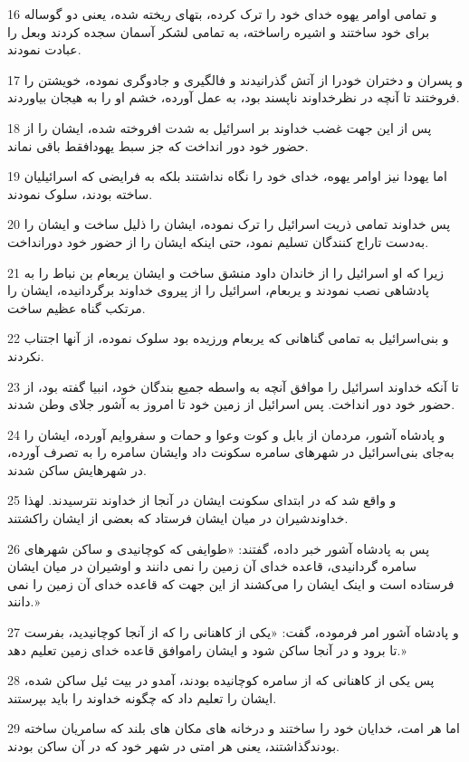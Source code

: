 \par 16 و تمامی اوامر یهوه خدای خود را ترک کرده، بتهای ریخته شده، یعنی دو گوساله برای خود ساختند و اشیره راساخته، به تمامی لشکر آسمان سجده کردند وبعل را عبادت نمودند.
\par 17 و پسران و دختران خودرا از آتش گذرانیدند و فالگیری و جادوگری نموده، خویشتن را فروختند تا آنچه در نظرخداوند ناپسند بود، به عمل آورده، خشم او را به هیجان بیاوردند.
\par 18 پس از این جهت غضب خداوند بر اسرائیل به شدت افروخته شده، ایشان را از حضور خود دور انداخت که جز سبط یهودافقط باقی نماند.
\par 19 اما یهودا نیز اوامر یهوه، خدای خود را نگاه نداشتند بلکه به فرایضی که اسرائیلیان ساخته بودند، سلوک نمودند.
\par 20 پس خداوند تمامی ذریت اسرائیل را ترک نموده، ایشان را ذلیل ساخت و ایشان را به‌دست تاراج کنندگان تسلیم نمود، حتی اینکه ایشان را از حضور خود دورانداخت.
\par 21 زیرا که او اسرائیل را از خاندان داود منشق ساخت و ایشان یربعام بن نباط را به پادشاهی نصب نمودند و یربعام، اسرائیل را از پیروی خداوند برگردانیده، ایشان را مرتکب گناه عظیم ساخت.
\par 22 و بنی‌اسرائیل به تمامی گناهانی که یربعام ورزیده بود سلوک نموده، از آنها اجتناب نکردند.
\par 23 تا آنکه خداوند اسرائیل را موافق آنچه به واسطه جمیع بندگان خود، انبیا گفته بود، از حضور خود دور انداخت. پس اسرائیل از زمین خود تا امروز به آشور جلای وطن شدند.
\par 24 و پادشاه آشور، مردمان از بابل و کوت وعوا و حمات و سفروایم آورده، ایشان را به‌جای بنی‌اسرائیل در شهرهای سامره سکونت داد وایشان سامره را به تصرف آورده، در شهرهایش ساکن شدند.
\par 25 و واقع شد که در ابتدای سکونت ایشان در آنجا از خداوند نترسیدند. لهذا خداوندشیران در میان ایشان فرستاد که بعضی از ایشان راکشتند.
\par 26 پس به پادشاه آشور خبر داده، گفتند: «طوایفی که کوچانیدی و ساکن شهرهای سامره گردانیدی، قاعده خدای آن زمین را نمی دانند و اوشیران در میان ایشان فرستاده است و اینک ایشان را می‌کشند از این جهت که قاعده خدای آن زمین را نمی دانند.»
\par 27 و پادشاه آشور امر فرموده، گفت: «یکی از کاهنانی را که از آنجا کوچانیدید، بفرست تا برود و در آنجا ساکن شود و ایشان راموافق قاعده خدای زمین تعلیم دهد.»
\par 28 پس یکی از کاهنانی که از سامره کوچانیده بودند، آمدو در بیت ئیل ساکن شده، ایشان را تعلیم داد که چگونه خداوند را باید بپرستند.
\par 29 اما هر امت، خدایان خود را ساختند و درخانه های مکان های بلند که سامریان ساخته بودندگذاشتند، یعنی هر امتی در شهر خود که در آن ساکن بودند.
